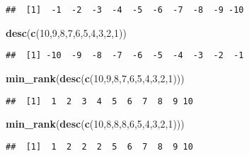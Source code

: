 \documentclass[
]{article}
\newenvironment{Shaded}{\begin{snugshade}}{\end{snugshade}}
\newcommand{\DecValTok}[1]{\textcolor[rgb]{0.00,0.00,0.81}{#1}}
\newcommand{\FunctionTok}[1]{\textcolor[rgb]{0.13,0.29,0.53}{\textbf{#1}}}
\newcommand{\NormalTok}[1]{#1}
\begin{document}
\begin{verbatim}
##  [1]  -1  -2  -3  -4  -5  -6  -7  -8  -9 -10
\end{verbatim}

\begin{Shaded}
\begin{Highlighting}[]
\FunctionTok{desc}\NormalTok{(}\FunctionTok{c}\NormalTok{(}\DecValTok{10}\NormalTok{,}\DecValTok{9}\NormalTok{,}\DecValTok{8}\NormalTok{,}\DecValTok{7}\NormalTok{,}\DecValTok{6}\NormalTok{,}\DecValTok{5}\NormalTok{,}\DecValTok{4}\NormalTok{,}\DecValTok{3}\NormalTok{,}\DecValTok{2}\NormalTok{,}\DecValTok{1}\NormalTok{))}
\end{Highlighting}
\end{Shaded}

\begin{verbatim}
##  [1] -10  -9  -8  -7  -6  -5  -4  -3  -2  -1
\end{verbatim}

\begin{Shaded}
\begin{Highlighting}[]
\FunctionTok{min\_rank}\NormalTok{(}\FunctionTok{desc}\NormalTok{(}\FunctionTok{c}\NormalTok{(}\DecValTok{10}\NormalTok{,}\DecValTok{9}\NormalTok{,}\DecValTok{8}\NormalTok{,}\DecValTok{7}\NormalTok{,}\DecValTok{6}\NormalTok{,}\DecValTok{5}\NormalTok{,}\DecValTok{4}\NormalTok{,}\DecValTok{3}\NormalTok{,}\DecValTok{2}\NormalTok{,}\DecValTok{1}\NormalTok{)))}
\end{Highlighting}
\end{Shaded}

\begin{verbatim}
##  [1]  1  2  3  4  5  6  7  8  9 10
\end{verbatim}

\begin{Shaded}
\begin{Highlighting}[]
\FunctionTok{min\_rank}\NormalTok{(}\FunctionTok{desc}\NormalTok{(}\FunctionTok{c}\NormalTok{(}\DecValTok{10}\NormalTok{,}\DecValTok{8}\NormalTok{,}\DecValTok{8}\NormalTok{,}\DecValTok{8}\NormalTok{,}\DecValTok{6}\NormalTok{,}\DecValTok{5}\NormalTok{,}\DecValTok{4}\NormalTok{,}\DecValTok{3}\NormalTok{,}\DecValTok{2}\NormalTok{,}\DecValTok{1}\NormalTok{)))}
\end{Highlighting}
\end{Shaded}

\begin{verbatim}
##  [1]  1  2  2  2  5  6  7  8  9 10
\end{verbatim}
\end{document}
